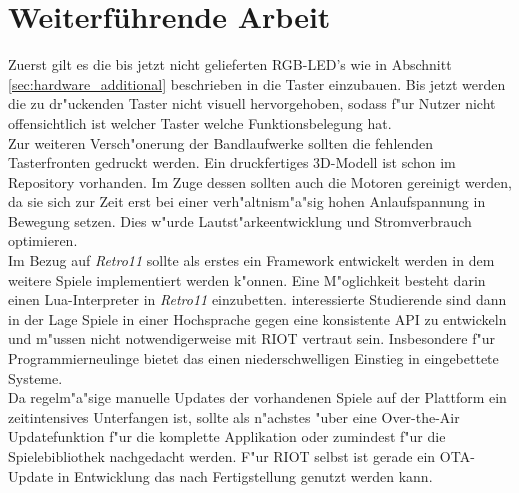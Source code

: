 \documentclass[a4paper]{article}
\begin{document}
\section{Weiterführende Arbeit}
  \label{sec:further}
  Zuerst gilt es die bis jetzt nicht gelieferten RGB-LED's wie in Abschnitt
  \ref{sec:hardware_additional} beschrieben in die Taster einzubauen. Bis jetzt
  werden die zu dr"uckenden Taster nicht visuell hervorgehoben, sodass f"ur
  Nutzer nicht offensichtlich ist welcher Taster welche Funktionsbelegung
  hat.\\ Zur weiteren Versch"onerung der Bandlaufwerke sollten die fehlenden
  Tasterfronten gedruckt werden. Ein druckfertiges 3D-Modell ist schon im
  Repository vorhanden. Im Zuge dessen sollten auch die Motoren gereinigt
  werden, da sie sich zur Zeit erst bei einer verh"altnism"a"sig hohen
  Anlaufspannung in Bewegung setzen. Dies w"urde Lautst"arkeentwicklung und
  Stromverbrauch optimieren.\\ Im Bezug auf \textit{Retro11} sollte als erstes
  ein Framework entwickelt werden in dem weitere Spiele implementiert werden
  k"onnen.  Eine M"oglichkeit besteht darin einen Lua-Interpreter in
  \textit{Retro11} einzubetten. interessierte Studierende sind dann in der Lage
  Spiele in einer Hochsprache gegen eine konsistente API zu entwickeln und
  m"ussen nicht notwendigerweise mit RIOT vertraut sein. Insbesondere f"ur
  Programmierneulinge bietet das einen niederschwelligen Einstieg in
  eingebettete Systeme.\\ Da regelm"a"sige manuelle Updates der vorhandenen
  Spiele auf der Plattform ein zeitintensives Unterfangen ist, sollte als
  n"achstes "uber eine Over-the-Air Updatefunktion f"ur die komplette
  Applikation oder zumindest f"ur die Spielebibliothek nachgedacht werden. F"ur
  RIOT selbst ist gerade ein OTA-Update in Entwicklung das nach Fertigstellung
  genutzt werden kann.\\\\
\end{document}
